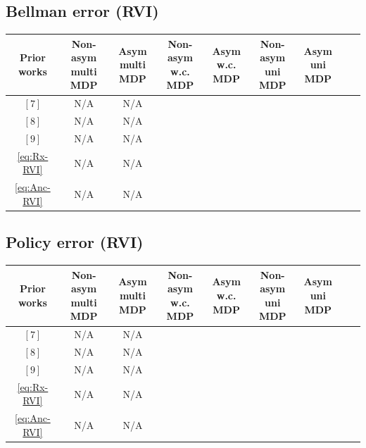 \documentclass{article} %
\newcommand{\cmark}{\ding{51}}%
\newcommand{\xmark}{\ding{55}}%
\begin{document}
\subsection{Bellman error (RVI)}\label{table_Bellman_error_RVI}
\begin{center}
\begin{tabular}{ |c|c|c|c|c|c|c|c|c| } 
 \hline
 Prior works & \makecell{Non-asym \\ multi MDP}& \makecell{Asym  \\ multi MDP}&  \makecell{Non-asym  \\ w.c. MDP}& \makecell{Asym  \\ w.c. MDP} &
  \makecell{Non-asym  \\ uni MDP}& \makecell{Asym  \\ uni MDP} \\
  \hline 
    $[7]$ & N/A &N/A & \xmark & \xmark & \cmark
    &  \cmark \\    $[8]$& N/A &N/A & \xmark & \xmark & \cmark &  \cmark  \\ 
   $[9]$& N/A &N/A & \xmark & \xmark & \cmark &  \cmark \\
  \hline
  \ref{eq:Rx-RVI}  & N/A &N/A & \cmark & \cmark & \cmark &  \cmark \\
  \ref{eq:Anc-RVI}  & N/A &N/A & \cmark & \cmark & \cmark &  \cmark \\
  \hline
\end{tabular}
\end{center}

\subsection{Policy error (RVI)}\label{table_near-optimal_policy_RVI}
\begin{center}
\begin{tabular}{ |c|c|c|c|c|c|c|c|c| } 
 \hline
  Prior works & \makecell{Non-asym \\ multi MDP}& \makecell{Asym  \\ multi MDP}&  \makecell{Non-asym  \\ w.c. MDP}& \makecell{Asym  \\ w.c. MDP} &
  \makecell{Non-asym  \\ uni MDP}& \makecell{Asym  \\ uni MDP} \\
  \hline 
    $[7]$ & N/A &N/A & \xmark & \xmark & \cmark
    &  \cmark \\    $[8]$& N/A &N/A & \xmark & \xmark & \cmark &  \cmark  \\ 
   $[9]$& N/A &N/A & \xmark & \xmark & \cmark &  \cmark \\
  \hline
  \ref{eq:Rx-RVI}  & N/A &N/A & \cmark & \cmark & \cmark &  \cmark \\
  \ref{eq:Anc-RVI}  & N/A &N/A & \cmark & \cmark & \cmark &  \cmark \\
  \hline
\end{tabular}
\end{center}
\end{document}
